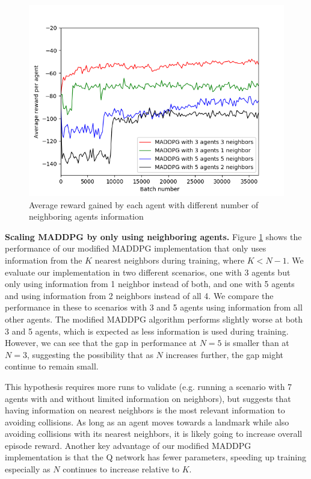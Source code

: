 \documentclass{article}
\begin{document}
\begin{figure}
\begin{center}
\includegraphics[scale=0.5]{MADDPG_different_neighbors.png}
\end{center}
\caption{Average reward gained by each agent with different number of neighboring agents information}
\label{fig:avg_reward_different_neighbors}
\end{figure}

\textbf{Scaling MADDPG by only using neighboring agents.} Figure \ref{fig:avg_reward_different_neighbors} shows the performance of our modified MADDPG implementation that only uses information from the $K$ nearest neighbors during training, where $K < N-1$. We evaluate our implementation in two different scenarios, one with 3 agents but only using information from 1 neighbor instead of both, and one with 5 agents and using information from 2 neighbors instead of all 4. We compare the performance in these to scenarios with 3 and 5 agents using information from all other agents. The modified MADDPG algorithm performs slightly worse at both 3 and 5 agents, which is expected as less information is used during training. However, we can see that the gap in performance at $N=5$ is smaller than at $N=3$, suggesting the possibility that as $N$ increases further, the gap might continue to remain small.

This hypothesis requires more runs to validate (e.g. running a scenario with 7 agents with and without limited information on neighbors), but suggests that having information on nearest neighbors is the most relevant information to avoiding collisions. As long as an agent moves towards a landmark while also avoiding collisions with its nearest neighbors, it is likely going to increase overall episode reward. Another key advantage of our modified MADDPG implementation is that the Q network has fewer parameters, speeding up training especially as $N$ continues to increase relative to $K$.
\end{document}
